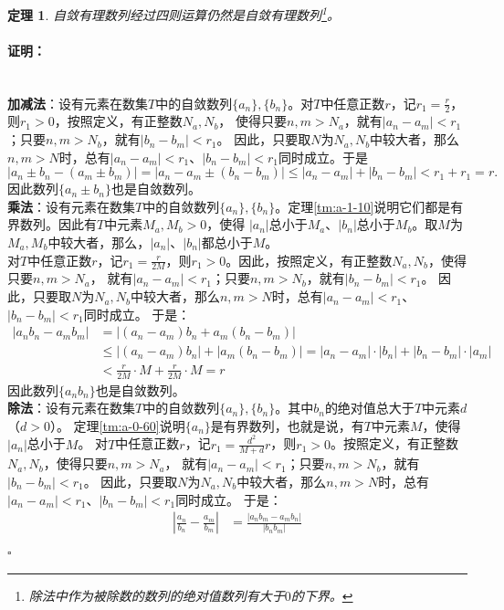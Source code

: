 \documentclass[12pt,UTF8]{ctexbook}
\newtheorem{tm}{定理}[section]
\renewenvironment{proof}{\paragraph{\textbf{证明：}}}{\hfill$\square$}
\begin{document}
\begin{appendix}
\begin{tm}\label{tm:a-1-3}
    自敛有理数列经过四则运算仍然是自敛有理数列\footnote{除法中作为被除数的数列的绝对值数列有大于$0$的下界。}。
\end{tm}
\begin{proof}
    \mbox{} \\
    \textbf{加减法}：设有元素在数集$T$中的自敛数列$\{a_n\}, \{b_n\}$。对$T$中任意正数$r$，记$r_1=\frac{r}{2}$，则$r_1>0$，按照定义，有正整数$N_a, N_b$，
    使得只要$n,m>N_a$，就有$|a_n - a_m| < r_1$；只要$n,m>N_b$，就有$|b_n - b_m| < r_1$。
    因此，只要取$N$为$N_a, N_b$中较大者，那么$n,m>N$时，总有$|a_n - a_m| < r_1$、$|b_n - b_m| < r_1$同时成立。于是
    $$ |a_n \pm b_n - (a_m \pm b_m)| = |a_n - a_m \pm (b_n - b_m)| \leqslant |a_n - a_m| + |b_n - b_m| < r_1 + r_1 = r. $$
    因此数列$\{a_n \pm b_n\}$也是自敛数列。\\
    \textbf{乘法}：设有元素在数集$T$中的自敛数列$\{a_n\}, \{b_n\}$。定理\ref{tm:a-1-10}说明它们都是有界数列。因此有$T$中元素$M_a, M_b>0$，使得
    $|a_n|$总小于$M_a$、$|b_n|$总小于$M_b$。取$M$为$M_a, M_b$中较大者，那么，$|a_n|$、$|b_n|$都总小于$M$。\\    
    对$T$中任意正数$r$，记$r_1 = \frac{r}{2M}$，则$r_1>0$。因此，按照定义，有正整数$N_a, N_b$，使得只要$n,m>N_a$，
    就有$|a_n - a_m| < r_1$；只要$n,m>N_b$，就有$|b_n - b_m| < r_1$。
    因此，只要取$N$为$N_a, N_b$中较大者，那么$n,m>N$时，总有$|a_n - a_m| < r_1$、$|b_n - b_m| < r_1$同时成立。
    于是：
    \begin{align*}
        |a_nb_n - a_mb_m| &= |(a_n - a_m)b_n + a_m(b_n - b_m)|  \\
        &\leqslant |(a_n - a_m)b_n| + |a_m(b_n - b_m)| = |a_n - a_m|\cdot |b_n| + |b_n - b_m|\cdot|a_m|  \\
        &< \frac{r}{2M} \cdot M + \frac{r}{2M} \cdot M = r 
    \end{align*}
    因此数列$\{a_n b_n\}$也是自敛数列。\\
    \textbf{除法}：设有元素在数集$T$中的自敛数列$\{a_n\}, \{b_n\}$。其中$b_n$的绝对值总大于$T$中元素$d$（$d > 0$）。
    定理\ref{tm:a-0-60}说明$\{a_n\}$是有界数列，也就是说，有$T$中元素$M$，使得$|a_n|$总小于$M$。
    对$T$中任意正数$r$，记$r_1 = \frac{d^2}{M+d}r$，则$r_1>0$。按照定义，有正整数$N_a, N_b$，使得只要$n,m>N_a$，
    就有$|a_n - a_m| < r_1$；只要$n,m>N_b$，就有$|b_n - b_m| < r_1$。
    因此，只要取$N$为$N_a, N_b$中较大者，那么$n,m>N$时，总有$|a_n - a_m| < r_1$、$|b_n - b_m| < r_1$同时成立。
    于是：
    \begin{align*}
        \left|\frac{a_n}{b_n} - \frac{a_m}{b_m}\right| &= \frac{|a_nb_m - a_mb_n|}{|b_nb_m|}  \\

\end{align*}
\end{proof}
\end{appendix}
\end{document}
